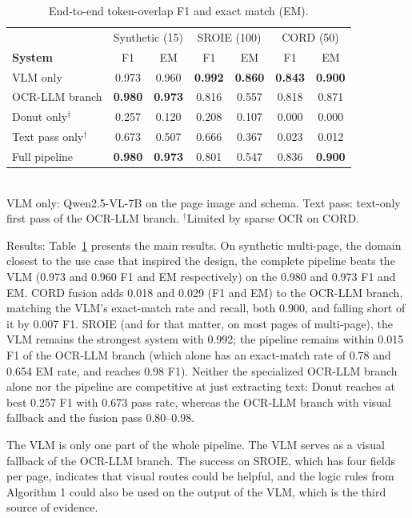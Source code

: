 \documentclass[conference]{IEEEtran}
\begin{document}
\begin{table}[t]
\centering
\caption{End-to-end token-overlap F1 and exact match (EM).}
\label{tab:e2e_aggregate}
\footnotesize
\setlength{\tabcolsep}{4pt}
\begin{tabular}{lcccccc}
\toprule
 & \multicolumn{2}{c}{Synthetic (15)} & \multicolumn{2}{c}{SROIE (100)} & \multicolumn{2}{c}{CORD (50)} \\
\textbf{System} & F1 & EM & F1 & EM & F1 & EM \\
\midrule
VLM only        & 0.973 & 0.960 & \textbf{0.992} & \textbf{0.860} & \textbf{0.843} & \textbf{0.900} \\
OCR-LLM branch   & \textbf{0.980} & \textbf{0.973} & 0.816 & 0.557 & 0.818 & 0.871 \\
Donut only$^\dagger$ & 0.257 & 0.120 & 0.208 & 0.107 & 0.000 & 0.000 \\
Text pass only$^\dagger$ & 0.673 & 0.507 & 0.666 & 0.367 & 0.023 & 0.012 \\
\midrule
Full pipeline   & \textbf{0.980} & \textbf{0.973} & 0.801 & 0.547 & 0.836 & \textbf{0.900} \\
\bottomrule
\end{tabular}\\[2pt]
{\scriptsize VLM only: Qwen2.5-VL-7B on the page image and schema. Text pass: text-only first pass of the OCR-LLM branch. $^\dagger$Limited by sparse OCR on CORD.}
\end{table}

Results: Table~\ref{tab:e2e_aggregate} presents the main results. On synthetic multi-page, the domain closest to the use case that inspired the design, the complete pipeline beats the VLM (0.973 and 0.960 F1 and EM respectively) on the 0.980 and 0.973 F1 and EM. CORD fusion adds 0.018 and 0.029 (F1 and EM) to the OCR-LLM branch, matching the VLM's exact-match rate and recall, both 0.900, and falling short of it by 0.007 F1. SROIE (and for that matter, on most pages of multi-page), the VLM remains the strongest system with 0.992; the pipeline remains within 0.015 F1 of the OCR-LLM branch (which alone has an exact-match rate of 0.78 and 0.654 EM rate, and reaches 0.98 F1). Neither the specialized OCR-LLM branch alone nor the pipeline are competitive at just extracting text: Donut reaches at best 0.257 F1 with 0.673 pass rate, whereas the OCR-LLM branch with visual fallback and the fusion pass 0.80--0.98.

The VLM is only one part of the whole pipeline. The VLM serves as a visual fallback of the OCR-LLM branch. The success on SROIE, which has four fields per page, indicates that visual routes could be helpful, and the logic rules from Algorithm 1 could also be used on the output of the VLM, which is the third source of evidence.
\end{document}
